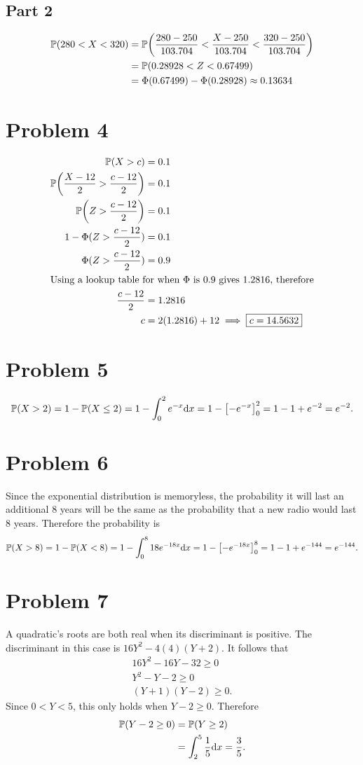 \documentclass[12pt]{extarticle}
\begin{document}
\subsection*{Part 2}
\begin{align*}
	\mathbb{P}\qty(280 < X < 320) &= \mathbb{P}\qty(\frac{280 - 250}{103.704} < \frac{X - 250}{103.704} < \frac{320 - 250}{103.704} ) \\
						 &= \mathbb{P}\qty(0.28928 < Z < 0.67499) \\
						 &= \Phi(0.67499) - \Phi(0.28928) \approx 0.13634
\end{align*}

\section*{Problem 4}
\begin{align*}
	\mathbb{P}\qty(X > c) &= 0.1 \\
	\mathbb{P}\qty(\frac{X - 12}{2} > \frac{c - 12}{2}) &= 0.1 \\
	\mathbb{P}\qty(Z > \frac{c - 12}{2}) &= 0.1 \\
	1 - \Phi(Z > \frac{c - 12}{2}) &= 0.1 \\
	\Phi(Z > \frac{c - 12}{2}) &= 0.9 \\
	\intertext{Using a lookup table for when $\Phi$ is $0.9$ gives $1.2816$, therefore}
	\frac{c - 12}{2} &= 1.2816 \\
	c &= 2(1.2816) + 12 \implies \boxed{c = 14.5632}
\end{align*}

\section*{Problem 5}
\[
	\mathbb{P}\qty(X > 2) = 1 - \mathbb{P}\qty(X \leq 2) = 1 - \int_0^2 e^{-x} \dd x = 1 - \qty[-e^{-x}]_0^2 = 1 - 1 + e^{-2} = e^{-2}
.\]

\section*{Problem 6}
Since the exponential distribution is memoryless, the probability it will last an additional 8 years will be the same as the probability that a new radio would last 8 years. Therefore the probability is
\[
	\mathbb{P}\qty(X > 8) = 1 - \mathbb{P}\qty(X < 8) = 1 - \int_0^8 18e^{-18x} \dd x = 1 - \qty[-e^{-18x}]_0^8 = 1 - 1 + e^{-144} = e^{-144}
.\]

\section*{Problem 7}
A quadratic's roots are both real when its discriminant is positive. The discriminant in this case is $16Y^2 - 4(4)(Y+2)$. It follows that
\begin{align*}
	16Y^2 - 16Y - 32 \geq 0 \\
	Y^2 - Y - 2 \geq 0 \\
	(Y + 1) (Y - 2) \geq 0
.\end{align*}
Since $0 < Y < 5$, this only holds when $Y - 2 \geq 0$. Therefore
\begin{align*}
	\mathbb{P}\qty(Y - 2 \geq 0) &= \mathbb{P}\qty(Y \geq 2) \\
	&= \int_2^5 \frac{1}{5} \dd x = \frac{3}{5}
.\end{align*}
\end{document}
